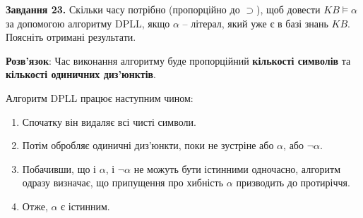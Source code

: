 \documentclass[a4paper,14pt]{extarticle} %
\begin{document}
\vspace{1cm} %
\textbf{Завдання 23.} Скільки часу потрібно (пропорційно до $\supset$), щоб довести
$KB \models \alpha$ за допомогою алгоритму DPLL, якщо $\alpha$ – літерал, який уже є
в базі знань $KB$. Поясніть отримані результати.

\textbf{Розв'язок}: Час виконання алгоритму буде пропорційний \textbf{кількості символів}
та \textbf{кількості одиничних диз’юнктів}.  

Алгоритм DPLL працює наступним чином:
\begin{enumerate}
  \item Спочатку він видаляє всі чисті символи.
  \item Потім обробляє одиничні диз'юнкти, поки не зустріне або $\alpha$, або $\neg \alpha$.
  \item Побачивши, що і $\alpha$, і $\neg \alpha$ не можуть бути істинними одночасно,
      алгоритм одразу визначає, що припущення про хибність $\alpha$ призводить до протиріччя.
  \item Отже, $\alpha$ є істинним.
\end{enumerate}
\end{document}
